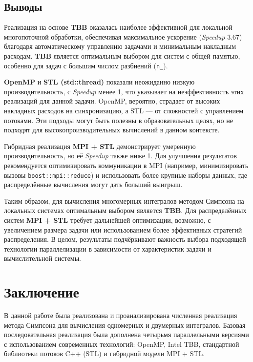 \documentclass[12pt]{article}
\begin{document}
\subsection*{Выводы}

\hspace*{1.25em}Реализация на основе \textbf{TBB} оказалась наиболее эффективной для локальной многопоточной обработки, обеспечивая максимальное ускорение (\textit{Speedup} 3.67) благодаря автоматическому управлению задачами и минимальным накладным расходам. \textbf{TBB} является оптимальным выбором для систем с общей памятью, особенно для задач с большим числом разбиений (\texttt{n\_}).

\hspace*{1.25em}\textbf{OpenMP} и \textbf{STL (std::thread)} показали неожиданно низкую производительность, с \textit{Speedup} менее 1, что указывает на неэффективность этих реализаций для данной задачи. OpenMP, вероятно, страдает от высоких накладных расходов на синхронизацию, а STL --- от сложностей с управлением потоками. Эти подходы могут быть полезны в образовательных целях, но не подходят для высокопроизводительных вычислений в данном контексте.

\hspace*{1.25em}Гибридная реализация \textbf{MPI + STL} демонстрирует умеренную производительность, но её \textit{Speedup} также ниже 1. Для улучшения результатов рекомендуется оптимизировать коммуникации в MPI (например, минимизировать вызовы \texttt{boost::mpi::reduce}) и использовать более крупные наборы данных, где распределённые вычисления могут дать больший выигрыш.

\hspace*{1.25em}Таким образом, для вычисления многомерных интегралов методом Симпсона на локальных системах оптимальным выбором является \textbf{TBB}. Для распределённых систем \textbf{MPI + STL} требует дальнейшей оптимизации, возможно, с увеличением размера задачи или использованием более эффективных стратегий распределения. В целом, результаты подчёркивают важность выбора подходящей технологии параллелизации в зависимости от характеристик задачи и вычислительной системы.

\section{Заключение}

\hspace*{1.25em}В данной работе была реализована и проанализирована численная реализация метода Симпсона для вычисления одномерных и двумерных интегралов. Базовая последовательная реализация была дополнена четырьмя параллельными версиями с использованием современных технологий: OpenMP, Intel TBB, стандартной библиотеки потоков C++ (STL) и гибридной модели MPI + STL.
\end{document}
